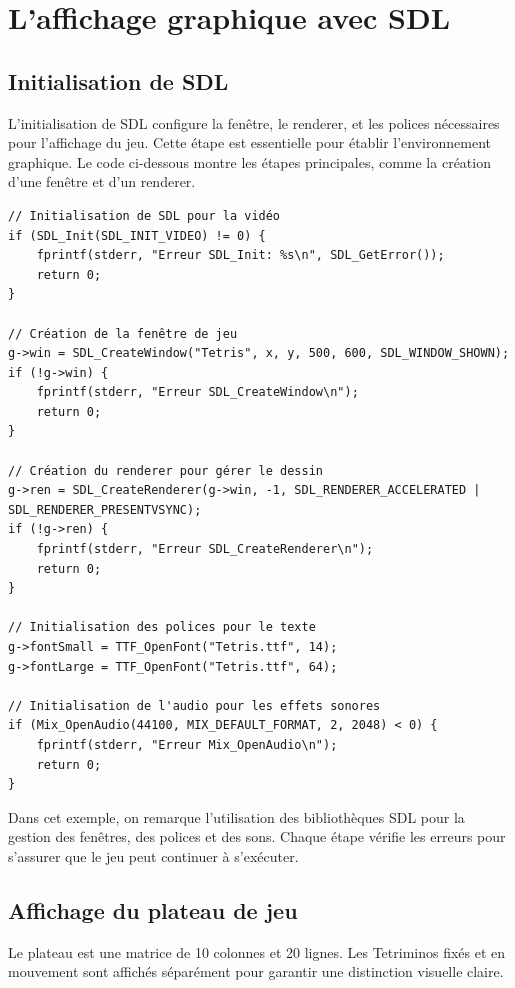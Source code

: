 \documentclass[12pt,a4paper]{report}
\begin{document}
\section{L’affichage graphique avec SDL}

\subsection{Initialisation de SDL}
L'initialisation de SDL configure la fenêtre, le renderer, et les polices nécessaires pour l'affichage du jeu. Cette étape est essentielle pour établir l'environnement graphique. Le code ci-dessous montre les étapes principales, comme la création d'une fenêtre et d'un renderer.

\begin{lstlisting}
// Initialisation de SDL pour la vidéo
if (SDL_Init(SDL_INIT_VIDEO) != 0) {
    fprintf(stderr, "Erreur SDL_Init: %s\n", SDL_GetError());
    return 0;
}

// Création de la fenêtre de jeu
g->win = SDL_CreateWindow("Tetris", x, y, 500, 600, SDL_WINDOW_SHOWN);
if (!g->win) {
    fprintf(stderr, "Erreur SDL_CreateWindow\n");
    return 0;
}

// Création du renderer pour gérer le dessin
g->ren = SDL_CreateRenderer(g->win, -1, SDL_RENDERER_ACCELERATED | SDL_RENDERER_PRESENTVSYNC);
if (!g->ren) {
    fprintf(stderr, "Erreur SDL_CreateRenderer\n");
    return 0;
}

// Initialisation des polices pour le texte
g->fontSmall = TTF_OpenFont("Tetris.ttf", 14);
g->fontLarge = TTF_OpenFont("Tetris.ttf", 64);

// Initialisation de l'audio pour les effets sonores
if (Mix_OpenAudio(44100, MIX_DEFAULT_FORMAT, 2, 2048) < 0) {
    fprintf(stderr, "Erreur Mix_OpenAudio\n");
    return 0;
}
\end{lstlisting}

Dans cet exemple, on remarque l'utilisation des bibliothèques SDL pour la gestion des fenêtres, des polices et des sons. Chaque étape vérifie les erreurs pour s'assurer que le jeu peut continuer à s'exécuter.
\newpage


\subsection{Affichage du plateau de jeu}
Le plateau est une matrice de 10 colonnes et 20 lignes. Les Tetriminos fixés et en mouvement sont affichés séparément pour garantir une distinction visuelle claire.
\end{document}
